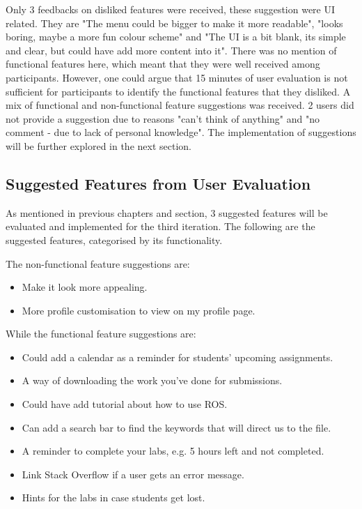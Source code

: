 \documentclass{l4proj}
\begin{document}
Only 3 feedbacks on disliked features were received, these suggestion were UI related. They are "The menu could be bigger to make it more readable", "looks boring, maybe a more fun colour scheme" and "The UI is a bit blank, its simple and clear, but could have add more content into it". There was no mention of functional features here, which meant that they were well received among participants. However, one could argue that 15 minutes of user evaluation is not sufficient for participants to identify the functional features that they disliked. A mix of functional and non-functional feature suggestions was received. 2 users did not provide a suggestion due to reasons "can't think of anything" and "no comment - due to lack of personal knowledge". The implementation of suggestions will be further explored in the next section. 

\subsection{Suggested Features from User Evaluation}

As mentioned in previous chapters and section, 3 suggested features will be evaluated and implemented for the third iteration. The following are the suggested features, categorised by its functionality.

The non-functional feature suggestions are:

\begin{itemize}
    \item 
    Make it look more appealing.
    \item 
    More profile customisation to view on my profile page.
\end{itemize}

While the functional feature suggestions are:

\begin{itemize}
    \item 
    Could add a calendar as a reminder for students' upcoming assignments.
    \item 
    A way of downloading the work you've done for submissions.
    \item
    Could have add tutorial about how to use ROS.
    \item
    Can add a search bar to find the keywords that will direct us to the file.
    \item
    A reminder to complete your labs, e.g. 5 hours left and not completed.
    \item
    Link Stack Overflow if a user gets an error message.
    \item
    Hints for the labs in case students get lost.
\end{itemize}
\end{document}
